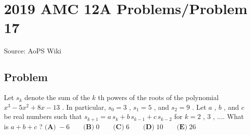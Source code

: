 \documentclass[12pt]{article}
\begin{document}
\section*{{2019 AMC 12A Problems/Problem 17}}
Source: AoPS Wiki

\subsection*{Problem}
Let $s_k$ denote the sum of the $\textit{k}$ th powers of the roots of the polynomial $x^3-5x^2+8x-13$ . In particular, $s_0=3$ , $s_1=5$ , and $s_2=9$ . Let $a$ , $b$ , and $c$ be real numbers such that $s_{k+1} = a \, s_k + b \, s_{k-1} + c \, s_{k-2}$ for $k = 2$ , $3$ , $....$ What is $a+b+c$ ? $\textbf{(A)} \; -6 \qquad \textbf{(B)} \; 0 \qquad \textbf{(C)} \; 6 \qquad \textbf{(D)} \; 10 \qquad \textbf{(E)} \; 26$
\end{document}
